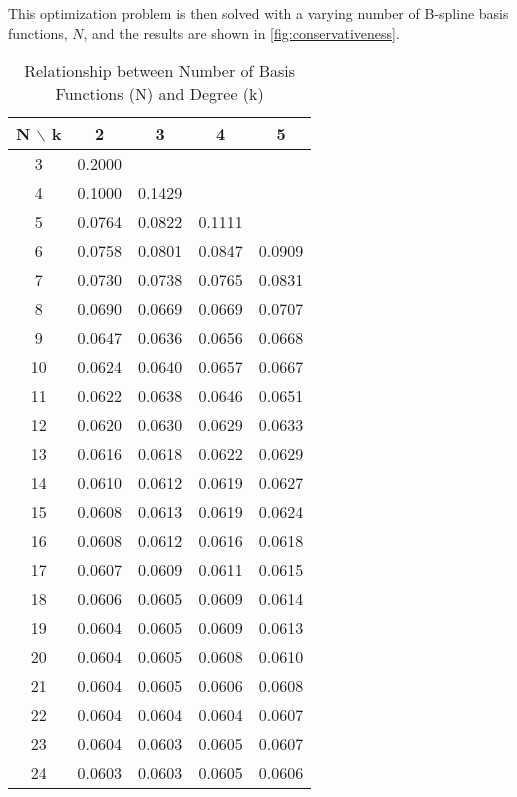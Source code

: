 This optimization problem is then solved with a varying number of B-spline basis functions, $N$, and the results are shown in \cref{fig:conservativeness}. 

\begin{table}[H] %
    \centering
    \caption{Relationship between Number of Basis Functions (N) and Degree (k)} 
    \label{tab:conservativeness_data} 
    \begin{tabular}{|c|cccc|} 
        \hline
        \textbf{N $\backslash$ k} & \textbf{2} & \textbf{3} & \textbf{4} & \textbf{5} \\ 
        \hline
        3  & 0.2000 &        &        &        \\
        4  & 0.1000 & 0.1429 &        &        \\
        5  & 0.0764 & 0.0822 & 0.1111 &        \\
        6  & 0.0758 & 0.0801 & 0.0847 & 0.0909 \\
        7  & 0.0730 & 0.0738 & 0.0765 & 0.0831 \\
        8  & 0.0690 & 0.0669 & 0.0669 & 0.0707 \\
        9  & 0.0647 & 0.0636 & 0.0656 & 0.0668 \\
        10 & 0.0624 & 0.0640 & 0.0657 & 0.0667 \\
        11 & 0.0622 & 0.0638 & 0.0646 & 0.0651 \\
        12 & 0.0620 & 0.0630 & 0.0629 & 0.0633 \\
        13 & 0.0616 & 0.0618 & 0.0622 & 0.0629 \\
        14 & 0.0610 & 0.0612 & 0.0619 & 0.0627 \\
        15 & 0.0608 & 0.0613 & 0.0619 & 0.0624 \\
        16 & 0.0608 & 0.0612 & 0.0616 & 0.0618 \\
        17 & 0.0607 & 0.0609 & 0.0611 & 0.0615 \\
        18 & 0.0606 & 0.0605 & 0.0609 & 0.0614 \\
        19 & 0.0604 & 0.0605 & 0.0609 & 0.0613 \\
        20 & 0.0604 & 0.0605 & 0.0608 & 0.0610 \\
        21 & 0.0604 & 0.0605 & 0.0606 & 0.0608 \\
        22 & 0.0604 & 0.0604 & 0.0604 & 0.0607 \\
        23 & 0.0604 & 0.0603 & 0.0605 & 0.0607 \\
        24 & 0.0603 & 0.0603 & 0.0605 & 0.0606 \\

\end{tabular}
\end{table}
